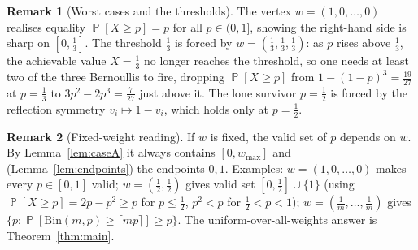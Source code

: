 \documentclass[11pt]{article}
\theoremstyle{definition}
\newtheorem{remark}{Remark}
\DeclareMathOperator{\PP}{\mathbb{P}}
\begin{document}
\begin{remark}[Worst cases and the thresholds]
The vertex $w=(1,0,\dots,0)$ realises equality $\PP[X\ge p]=p$ for all
$p\in(0,1]$, showing the right-hand side is sharp on $[0,\tfrac13]$. The
threshold $\tfrac13$ is forced by $w=(\tfrac13,\tfrac13,\tfrac13)$: as $p$ rises
above $\tfrac13$, the achievable value $X=\tfrac13$ no longer reaches the
threshold, so one needs at least two of the three Bernoullis to fire, dropping
$\PP[X\ge p]$ from $1-(1-p)^3=\tfrac{19}{27}$ at $p=\tfrac13$ to
$3p^2-2p^3=\tfrac{7}{27}$ just above it. The lone survivor $p=\tfrac12$ is forced
by the reflection symmetry $v_i\mapsto1-v_i$, which holds only at $p=\tfrac12$.
\end{remark}

\begin{remark}[Fixed-weight reading]\label{rem:fixed}
If $w$ is fixed, the valid set of $p$ depends on $w$. By Lemma~\ref{lem:caseA} it
always contains $[0,w_{\max}]$ and (Lemma~\ref{lem:endpoints}) the endpoints
$0,1$. Examples: $w=(1,0,\dots,0)$ makes every $p\in[0,1]$ valid;
$w=(\tfrac12,\tfrac12)$ gives valid set $[0,\tfrac12]\cup\{1\}$ (using
$\PP[X\ge p]=2p-p^2\ge p$ for $p\le\tfrac12$, $p^2<p$ for $\tfrac12<p<1$);
$w=(\tfrac1m,\dots,\tfrac1m)$ gives $\{p:\PP[\mathrm{Bin}(m,p)\ge\lceil mp\rceil]
\ge p\}$. The uniform-over-all-weights answer is
Theorem~\ref{thm:main}.
\end{remark}
\end{document}
